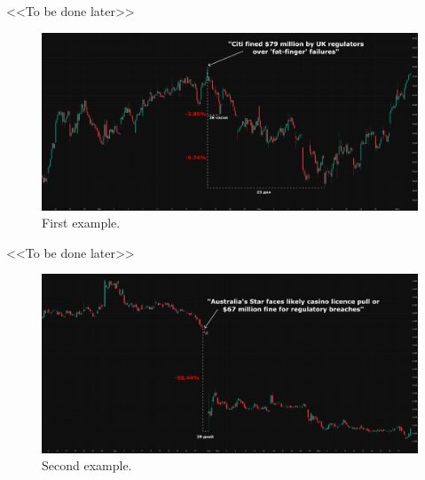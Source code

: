 <<To be done later>>

\begin{figure}[H]
    \centering
    \includegraphics[width=1\linewidth]{img/citi_group.png}
    \caption{First example.}
    \label{fig:citi_group}
\end{figure}

<<To be done later>>

\begin{figure}[H]
    \centering
    \includegraphics[width=1\linewidth]{img/star_entertainment.png}
    \caption{Second example.}
    \label{fig:star_entertainment}
\end{figure}